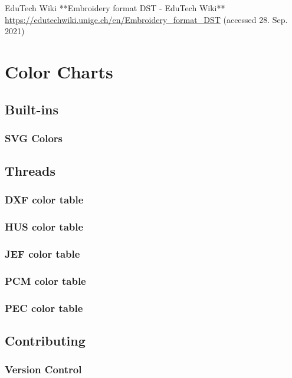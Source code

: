 \documentclass[11pt]{report}
\begin{document}
EduTech Wiki
**Embroidery format DST - EduTech Wiki**
\url{https://edutechwiki.unige.ch/en/Embroidery_format_DST}
(accessed 28. Sep. 2021)

\chapter{Color Charts}

\section{Built-ins}

\subsection{SVG Colors}

\section{Threads}

\subsection{DXF color table}

\subsection{HUS color table}

\subsection{JEF color table}

\subsection{PCM color table}

\subsection{PEC color table}

\section{Contributing}

\subsection{Version Control}
\end{document}
